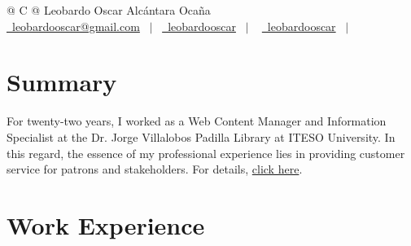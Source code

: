 \documentclass[a4paper,12pt]{article}
\begin{document}
\pagestyle{empty} 



\begin{tabularx}{\linewidth}{@{} C @{}}
\Huge{Leobardo Oscar Alcántara Ocaña} \\[7.5pt]
\href{mailto:leobardooscar@gmail.com}{\raisebox{-0.05\height}\faEnvelope \ leobardooscar@gmail.com} \ $|$ \ 
\href{https://github.com/leobardooscar}{\raisebox{-0.05\height}\faGithub\ leobardooscar} \ $|$ \ 
\href{https://linktr.ee/leobardooscar}{\raisebox{-0.05\height}\faGlobe \ leobardooscar} \ $|$ \ 
\end{tabularx}


\section{Summary}
For twenty-two years, I worked as a Web Content Manager and Information Specialist at the Dr. Jorge Villalobos Padilla Library at ITESO University. In this regard, the essence of my professional experience lies in providing customer service for patrons and stakeholders. For details, \href{https://leobardooscar.github.io/portfolio/}{click here}.

\section{Work Experience}
\end{document}
